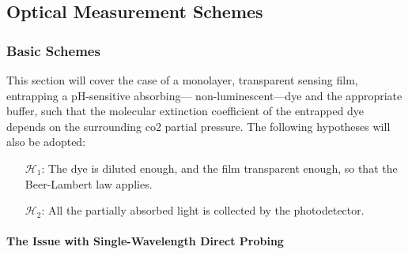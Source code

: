 \subsection{Optical Measurement Schemes}\label{sect:choos:dye_based:optical_schemes}

\subsubsection{Basic Schemes}\label{sect:choos:dye_based:optical_schemes:basic}

This section will cover the case of a monolayer, transparent sensing film, entrapping a pH-sensitive absorbing---\ie{} non-luminescent---dye and the appropriate buffer, such that the molecular extinction coefficient of the entrapped dye depends on the surrounding \gls{co2} partial pressure. The following hypotheses will also be adopted:
\begin{itemize}
	\item[$\mathcal{H}_1$:] The dye is diluted enough, and the film transparent enough, so that the Beer-Lambert law applies.
	\item[$\mathcal{H}_2$:] All the partially absorbed light is collected by the photodetector.
\end{itemize}

\paragraph{The Issue with Single-Wavelength Direct Probing}\label{subsect:choos:dye_based:optical_schemes:single_issue}\mbox{}\\

